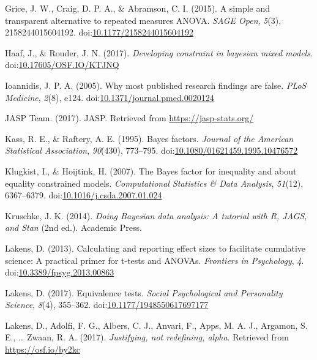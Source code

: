 \documentclass[english,man]{apa6}
\theoremstyle{definition}
\theoremstyle{definition}
\theoremstyle{definition}
\theoremstyle{remark}
\begin{document}
\hypertarget{ref-Grice2015}{}
Grice, J. W., Craig, D. P. A., \& Abramson, C. I. (2015). A simple and
transparent alternative to repeated measures ANOVA. \emph{SAGE Open},
\emph{5}(3), 2158244015604192.
doi:\href{https://doi.org/10.1177/2158244015604192}{10.1177/2158244015604192}

\hypertarget{ref-Haaf2017}{}
Haaf, J., \& Rouder, J. N. (2017). \emph{Developing constraint in
bayesian mixed models}.
doi:\href{https://doi.org/10.17605/OSF.IO/KTJNQ}{10.17605/OSF.IO/KTJNQ}

\hypertarget{ref-Ioannidis2005}{}
Ioannidis, J. P. A. (2005). Why most published research findings are
false. \emph{PLoS Medicine}, \emph{2}(8), e124.
doi:\href{https://doi.org/10.1371/journal.pmed.0020124}{10.1371/journal.pmed.0020124}

\hypertarget{ref-JASPTeam2017}{}
JASP Team. (2017). JASP. Retrieved from \url{https://jasp-stats.org/}

\hypertarget{ref-Kass1995}{}
Kass, R. E., \& Raftery, A. E. (1995). Bayes factors. \emph{Journal of
the American Statistical Association}, \emph{90}(430), 773--795.
doi:\href{https://doi.org/10.1080/01621459.1995.10476572}{10.1080/01621459.1995.10476572}

\hypertarget{ref-Klugkist2007}{}
Klugkist, I., \& Hoijtink, H. (2007). The Bayes factor for inequality
and about equality constrained models. \emph{Computational Statistics \&
Data Analysis}, \emph{51}(12), 6367--6379.
doi:\href{https://doi.org/10.1016/j.csda.2007.01.024}{10.1016/j.csda.2007.01.024}

\hypertarget{ref-Kruschke2014}{}
Kruschke, J. K. (2014). \emph{Doing Bayesian data analysis: A tutorial
with R, JAGS, and Stan} (2nd ed.). Academic Press.

\hypertarget{ref-Lakens2013}{}
Lakens, D. (2013). Calculating and reporting effect sizes to facilitate
cumulative science: A practical primer for t-tests and ANOVAs.
\emph{Frontiers in Psychology}, \emph{4}.
doi:\href{https://doi.org/10.3389/fpsyg.2013.00863}{10.3389/fpsyg.2013.00863}

\hypertarget{ref-Lakens2017a}{}
Lakens, D. (2017). Equivalence tests. \emph{Social Psychological and
Personality Science}, \emph{8}(4), 355--362.
doi:\href{https://doi.org/10.1177/1948550617697177}{10.1177/1948550617697177}

\hypertarget{ref-Lakens2017}{}
Lakens, D., Adolfi, F. G., Albers, C. J., Anvari, F., Apps, M. A. J.,
Argamon, S. E., \ldots{} Zwaan, R. A. (2017). \emph{Justifying, not
redefining, alpha}. Retrieved from \url{https://osf.io/by2kc}
\end{document}
